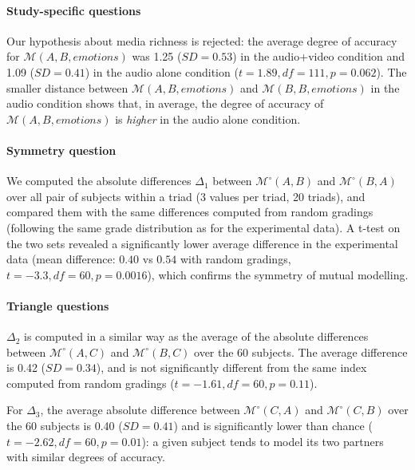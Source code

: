 \documentclass[natbib]{svjour3}
\newcommand{\model}[3]{{$\mathcal{M}(#1, #2, #3)$}}
\newcommand{\gModel}[2]{{$\mathcal{M}^{\circ}(#1, #2)$}}
\begin{document}
\paragraph{Study-specific questions} Our hypothesis about media richness is
rejected: the average degree of accuracy for \model{A}{B}{emotions} was 1.25
($SD = 0.53$) in the audio+video condition and 1.09 ($SD = 0.41$) in the audio
alone condition ($t=1.89, df=111, p = 0.062$). The smaller distance between
\model{A}{B}{emotions} and \model{B}{B}{emotions} in the audio condition shows
that, in average, the degree of accuracy of \model{A}{B}{emotions} is
\emph{higher} in the audio alone condition.

\paragraph{Symmetry question} We computed the absolute differences $\Delta_1$
between \gModel{A}{B} and \gModel{B}{A} over all pair of subjects within a triad
(3 values per triad, 20 triads), and compared them with the same differences
computed from random gradings (following the same grade distribution as for the
experimental data). A t-test on the two sets revealed a significantly lower average difference in
the experimental data (mean difference: $0.40$ vs $0.54$ with random gradings,
$t=-3.3, df=60, p = 0.0016$), which confirms the symmetry of mutual modelling.

\paragraph{Triangle questions} $\Delta_2$ is computed in a similar way as the average of
the absolute differences between \gModel{A}{C} and \gModel{B}{C} over the 60
subjects. The average difference is 0.42 ($SD= 0.34$), and is not significantly
different from the same index computed from random gradings ($t=-1.61, df=60,
p=0.11$).

For $\Delta_3$, the average absolute difference between \gModel{C}{A} and
\gModel{C}{B} over the 60 subjects is 0.40 ($SD= 0.41$) and is significantly
lower than chance ($t=-2.62, df=60, p=0.01$): a given subject tends to model its
two partners with similar degrees of accuracy.
\end{document}
